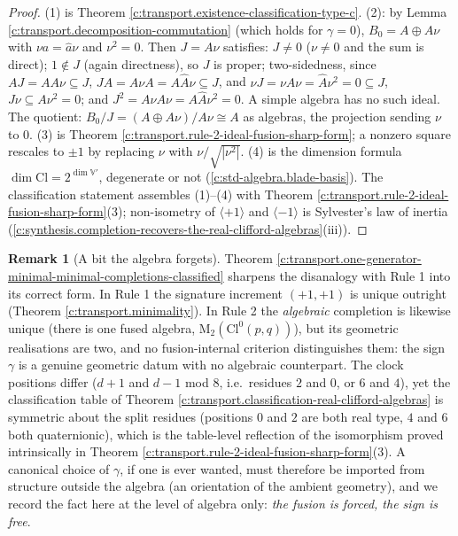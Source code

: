 \documentclass[11pt]{article}
\theoremstyle{definition}
\newtheorem{remark}[theorem]{Remark}
\theoremstyle{plain}
\providecommand{\Cl}{}\renewcommand{\Cl}{\mathrm{Cl}}
\providecommand{\Mat}{}\renewcommand{\Mat}{\mathrm{M}}
\begin{document}
\begin{proof}
(1) is Theorem \ref{c:transport.existence-classification-type-c}. (2): by Lemma \ref{c:transport.decomposition-commutation} (which holds for $\gamma = 0$), $B_0 = A \oplus A\nu$ with $\nu a = \hat{a}\nu$ and $\nu^2 = 0$. Then $J = A\nu$ satisfies: $J \neq 0$ ($\nu \neq 0$ and the sum is direct); $1 \notin J$ (again directness), so $J$ is proper; two-sidedness, since $A J = A A \nu \subseteq J$, $J A = A \nu A = A \hat{A} \nu \subseteq J$, and $\nu J = \nu A \nu = \hat{A} \nu^2 = 0 \subseteq J$, $J\nu \subseteq A\nu^2 = 0$; and $J^2 = A\nu A \nu = A \hat{A} \nu^2 = 0$. A simple algebra has no such ideal. The quotient: $B_0 / J = (A \oplus A\nu)/A\nu \cong A$ as algebras, the projection sending $\nu$ to $0$. (3) is Theorem \ref{c:transport.rule-2-ideal-fusion-sharp-form}; a nonzero square rescales to $\pm 1$ by replacing $\nu$ with $\nu/\sqrt{|\nu^2|}$. (4) is the dimension formula $\dim \Cl = 2^{\dim \mathbb{V}'}$, degenerate or not (\ref{c:std-algebra.blade-basis}). The classification statement assembles (1)--(4) with Theorem \ref{c:transport.rule-2-ideal-fusion-sharp-form}(3); non-isometry of $\langle +1\rangle$ and $\langle -1 \rangle$ is Sylvester's law of inertia (\ref{c:synthesis.completion-recovers-the-real-clifford-algebras}(iii)).

\end{proof}

\begin{remark}[A bit the algebra forgets]\label{c:note.transport.bit-algebra-forgets}
Theorem \ref{c:transport.one-generator-minimal-minimal-completions-classified} sharpens the disanalogy with Rule 1 into its correct form. In Rule 1 the signature increment $(+1,+1)$ is unique outright (Theorem \ref{c:transport.minimality}). In Rule 2 the \emph{algebraic} completion is likewise unique (there is one fused algebra, $\Mat_2(\Cl^0(p,q))$), but its geometric realisations are two, and no fusion-internal criterion distinguishes them: the sign $\gamma$ is a genuine geometric datum with no algebraic counterpart. The clock positions differ ($d + 1$ and $d - 1$ mod 8, i.e.\ residues $2$ and $0$, or $6$ and $4$), yet the classification table of Theorem \ref{c:transport.classification-real-clifford-algebras} is symmetric about the split residues (positions $0$ and $2$ are both real type, $4$ and $6$ both quaternionic), which is the table-level reflection of the isomorphism proved intrinsically in Theorem \ref{c:transport.rule-2-ideal-fusion-sharp-form}(3). A canonical choice of $\gamma$, if one is ever wanted, must therefore be imported from structure outside the algebra (an orientation of the ambient geometry), and we record the fact here at the level of algebra only: \emph{the fusion is forced, the sign is free}.
\end{remark}
\end{document}
